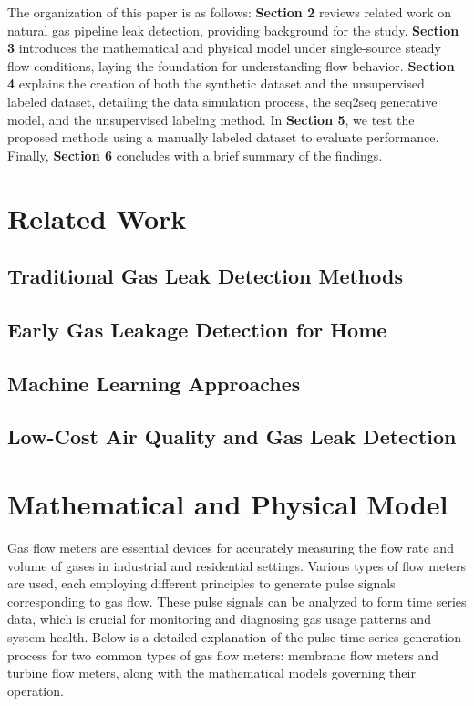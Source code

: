 \documentclass[10pt, sigconf]{acmart}
\begin{document}
The organization of this paper is as follows: \textbf{Section 2} reviews related work on natural gas pipeline leak detection, providing background for the study. \textbf{Section 3} introduces the mathematical and physical model under single-source steady flow conditions, laying the foundation for understanding flow behavior. \textbf{Section 4} explains the creation of both the synthetic dataset and the unsupervised labeled dataset, detailing the data simulation process, the seq2seq generative model, and the unsupervised labeling method. In \textbf{Section 5}, we test the proposed methods using a manually labeled dataset to evaluate performance. Finally, \textbf{Section 6} concludes with a brief summary of the findings.

\section{Related Work}
\subsection{Traditional Gas Leak Detection Methods}

\subsection{Early Gas Leakage Detection for Home}

\subsection{Machine Learning Approaches}

\subsection{Low-Cost Air Quality and Gas Leak Detection}

\section{Mathematical and Physical Model}

Gas flow meters are essential devices for accurately measuring the flow rate and volume of gases in industrial and residential settings. Various types of flow meters are used, each employing different principles to generate pulse signals corresponding to gas flow. These pulse signals can be analyzed to form time series data, which is crucial for monitoring and diagnosing gas usage patterns and system health. Below is a detailed explanation of the pulse time series generation process for two common types of gas flow meters: membrane flow meters and turbine flow meters, along with the mathematical models governing their operation.
\end{document}
